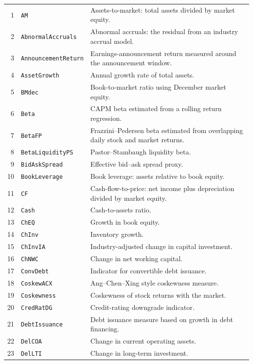 \documentclass[11pt,letterpaper]{article}
\begin{document}
{\begin{longtable}{@{} r p{} p{} @{}}
  1 & \texttt{AM} & Assets-to-market: total assets divided by market equity. \\
  2 & \texttt{AbnormalAccruals} & Abnormal accruals: the residual from an industry accrual model. \\
  3 & \texttt{AnnouncementReturn} & Earnings-announcement return measured around the announcement window. \\
  4 & \texttt{AssetGrowth} & Annual growth rate of total assets. \\
  5 & \texttt{BMdec} & Book-to-market ratio using December market equity. \\
  6 & \texttt{Beta} & CAPM beta estimated from a rolling return regression. \\
  7 & \texttt{BetaFP} & Frazzini--Pedersen beta estimated from overlapping daily stock and market returns. \\
  8 & \texttt{BetaLiquidityPS} & Pastor--Stambaugh liquidity beta. \\
  9 & \texttt{BidAskSpread} & Effective bid--ask spread proxy. \\
  10 & \texttt{BookLeverage} & Book leverage: assets relative to book equity. \\
  11 & \texttt{CF} & Cash-flow-to-price: net income plus depreciation divided by market equity. \\
  12 & \texttt{Cash} & Cash-to-assets ratio. \\
  13 & \texttt{ChEQ} & Growth in book equity. \\
  14 & \texttt{ChInv} & Inventory growth. \\
  15 & \texttt{ChInvIA} & Industry-adjusted change in capital investment. \\
  16 & \texttt{ChNWC} & Change in net working capital. \\
  17 & \texttt{ConvDebt} & Indicator for convertible debt issuance. \\
  18 & \texttt{CoskewACX} & Ang--Chen--Xing style coskewness measure. \\
  19 & \texttt{Coskewness} & Coskewness of stock returns with the market. \\
  20 & \texttt{CredRatDG} & Credit-rating downgrade indicator. \\
  21 & \texttt{DebtIssuance} & Debt issuance measure based on growth in debt financing. \\
  22 & \texttt{DelCOA} & Change in current operating assets. \\
  23 & \texttt{DelLTI} & Change in long-term investment. \\

\end{longtable}}
\end{document}
